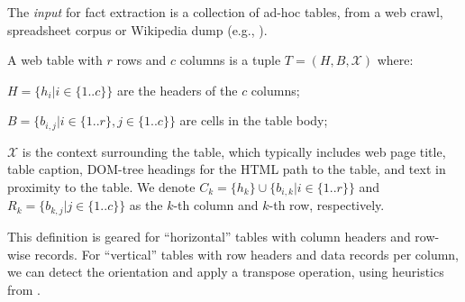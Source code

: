 The \textit{input} for fact extraction is a collection of
ad-hoc tables, from a web crawl, spreadsheet corpus
or Wikipedia dump
(e.g., \cite{DBLP:conf/bdc/EberiusBHTAL15}).

\vspace{0.1cm}
A web table with $r$ rows and
$c$ columns 
is a tuple
$T = (H, B, \mathcal{X})$ where:
\squishlist
\item[-] ${H} = \{h_i | i \in \{1..c\}\}$ are the headers of the $c$ columns;
\item[-] ${B} = \{b_{i,j} | i \in \{1..r\}, j \in \{1..c\}\}$ are cells in the table body;
\item[-] $\mathcal{X}$ is the context surrounding the table, which typically includes web page title, table caption, DOM-tree headings for the HTML path to the table,
and text in proximity to the table.
\squishend
We denote ${C}_k = \{h_k\} \cup \{b_{i,k} | i \in \{1..r\}\}$ and ${R}_k = \{b_{k,j} | j \in \{1..c\}\}$ as the $k$-th column and $k$-th row, respectively.

\vspace{0.1cm}
This definition is geared for ``horizontal'' tables with column headers and row-wise records. For ``vertical'' tables with row headers and data records per column, we can detect the orientation and apply a
{transpose} operation, using heuristics from \cite{DBLP:journals/pvldb/CafarellaHLMYWW18}.


